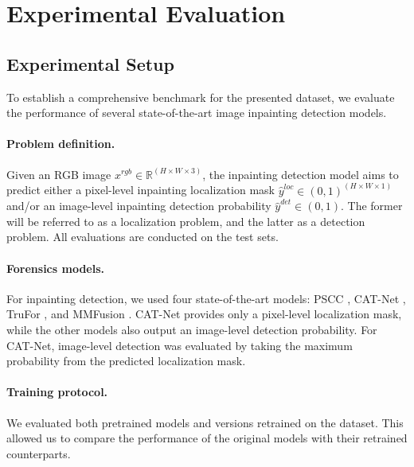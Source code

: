 \section{Experimental Evaluation}
\label{sec:experiments}

\subsection{Experimental Setup}

To establish a comprehensive benchmark for the presented \emph{\datasetname} dataset, we evaluate the performance of several state-of-the-art image inpainting detection models. 
\vspace{-14pt} 
\paragraph{Problem definition.} Given an RGB image \( x^{rgb} \in \mathbb{R}^{(H \times W \times 3)} \), the inpainting detection model aims to predict either a pixel-level inpainting localization mask \( \hat{y}^{loc} \in (0,1)^{(H \times W \times 1)} \) and/or an image-level inpainting detection probability \( \hat{y}^{det} \in (0,1) \). The former will be referred to as a localization problem, and the latter as a detection problem. All evaluations are conducted on the test sets.
\vspace{-14pt}
\paragraph{Forensics models.} For inpainting detection, we used four state-of-the-art models: PSCC \cite{luy2022pscc}, CAT-Net \cite{kwon2022catnet}, TruFor \cite{guillaro2023trufor}, and MMFusion \cite{triaridis2023mmfusion}. CAT-Net provides only a pixel-level localization mask, while the other models also output an image-level detection probability. For CAT-Net, image-level detection was evaluated by taking the maximum probability from the predicted localization mask.
\vspace{-14pt} 
\paragraph{Training protocol.} We evaluated both pretrained models and versions retrained on the \emph{\datasetname} dataset. This allowed us to compare the performance of the original models with their retrained counterparts. %
\vspace{-14pt} 
